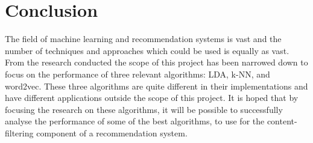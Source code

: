 \section{Conclusion}
The field of machine learning and recommendation systems is vast and the number of techniques and approaches which could be used is equally as vast.
From the research conducted the scope of this project has been narrowed down to focus on the performance of three relevant algorithms: LDA, k-NN, and word2vec.
These three algorithms are quite different in their implementations and have different applications outside the scope of this project.
It is hoped that by focusing the research on these algorithms, it will be possible to successfully analyse the performance of some of the best algorithms, to use for the content-filtering component of a recommendation system.
